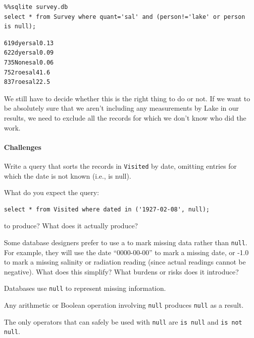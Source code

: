 \documentclass{book}
\begin{document}
\begin{verbatim}
%%sqlite survey.db
select * from Survey where quant='sal' and (person!='lake' or person is null);
\end{verbatim}

\begin{verbatim}
619dyersal0.13
622dyersal0.09
735Nonesal0.06
752roesal41.6
837roesal22.5
\end{verbatim}

We still have to decide whether this is the right thing to do or not. If
we want to be absolutely sure that we aren't including any measurements
by Lake in our results, we need to exclude all the records for which we
don't know who did the work.

\mbox{}\paragraph{Challenges}

\begin{swcenumerate}
\item
  Write a query that sorts the records in \texttt{Visited} by date,
  omitting entries for which the date is not known (i.e., is null).
\item
  What do you expect the query:

\begin{verbatim}
select * from Visited where dated in ('1927-02-08', null);
\end{verbatim}

  to produce? What does it actually produce?
\item
  Some database designers prefer to use a
   to mark missing data
  rather than \texttt{null}. For example, they will use the date
  ``0000-00-00'' to mark a missing date, or -1.0 to mark a missing
  salinity or radiation reading (since actual readings cannot be
  negative). What does this simplify? What burdens or risks does it
  introduce?
\end{swcenumerate}

\begin{keypoints}
\begin{swcitemize}
\item
  Databases use \texttt{null} to represent missing information.
\item
  Any arithmetic or Boolean operation involving \texttt{null} produces
  \texttt{null} as a result.
\item
  The only operators that can safely be used with \texttt{null} are
  \texttt{is null} and \texttt{is not null}.
\end{swcitemize}
\end{keypoints}
\end{document}
